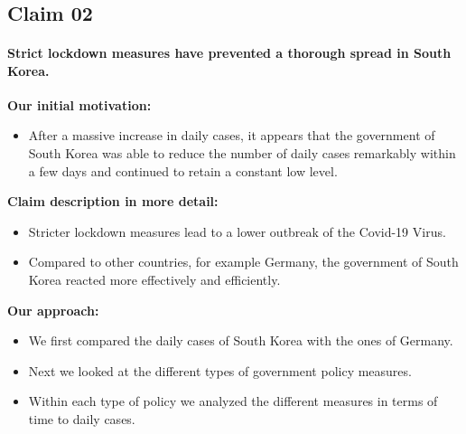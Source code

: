 \documentclass[
]{article}
\providecommand{\tightlist}{%
  \setlength{\itemsep}{0pt}\setlength{\parskip}{0pt}}
\begin{document}
~

\hypertarget{claim-02}{%
\subsection{Claim 02}\label{claim-02}}

\hypertarget{strict-lockdown-measures-have-prevented-a-thorough-spread-in-south-korea.}{%
\paragraph{Strict lockdown measures have prevented a thorough spread in
South
Korea.}\label{strict-lockdown-measures-have-prevented-a-thorough-spread-in-south-korea.}}

\textbf{Our initial motivation:}

\begin{itemize}
\tightlist
\item
  After a massive increase in daily cases, it appears that the
  government of South Korea was able to reduce the number of daily cases
  remarkably within a few days and continued to retain a constant low
  level.
\end{itemize}

\textbf{Claim description in more detail:}

\begin{itemize}
\tightlist
\item
  Stricter lockdown measures lead to a lower outbreak of the Covid-19
  Virus.
\item
  Compared to other countries, for example Germany, the government of
  South Korea reacted more effectively and efficiently.
\end{itemize}

\textbf{Our approach:}

\begin{itemize}
\tightlist
\item
  We first compared the daily cases of South Korea with the ones of
  Germany.
\item
  Next we looked at the different types of government policy measures.
\item
  Within each type of policy we analyzed the different measures in terms
  of time to daily cases.
\end{itemize}

~
\end{document}
